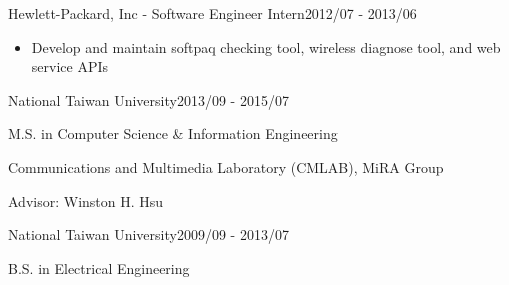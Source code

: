 \documentclass{joel_cv}
\begin{document}
\begin{profExp}{Hewlett-Packard, Inc - Software Engineer Intern}{2012/07 - 2013/06}{
        \begin{itemize}
            \item Develop and maintain softpaq checking tool, wireless diagnose tool, and web service APIs
        \end{itemize}
    }
\end{profExp}

%
%

\begin{sectionContentSimple}{National Taiwan University}{2013/09 - 2015/07}
    \item M.S. in Computer Science \& Information Engineering
    \item Communications and Multimedia Laboratory (CMLAB), MiRA Group
    \item Advisor: Winston H. Hsu
\end{sectionContentSimple}

\begin{sectionContentSimple}{National Taiwan University}{2009/09 - 2013/07}
    \item B.S. in Electrical Engineering
\end{sectionContentSimple}

%
%
\end{document}
